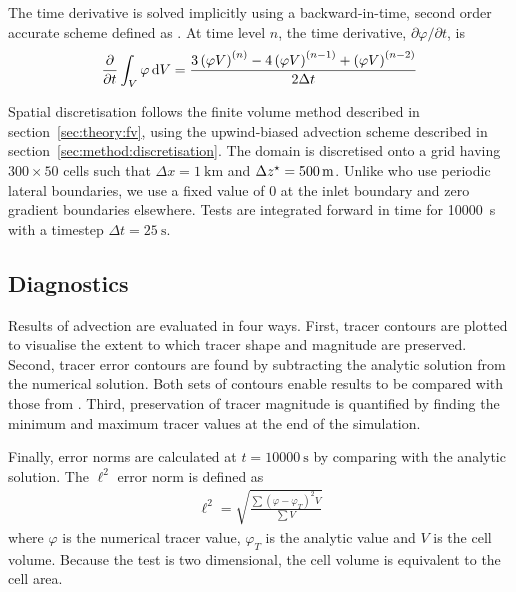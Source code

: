 The time derivative is solved implicitly using a backward-in-time, second order accurate scheme defined as \autocite{openfoam-progguide}.  At time level $n$, the time derivative, $\partial \varphi / \partial t$, is
\begin{align}
	\frac{\partial}{\partial t} \int_V \varphi \mathop{}\!\mathrm{d} V = \frac{
		3 \left( \varphi V \right)^{(n)} - 
		4 \left( \varphi V \right)^{(n-1)} + 
		\left( \varphi V \right)^{(n-2)}
	}{2 \Delta t}
\end{align}

Spatial discretisation follows the finite volume method described in section~\ref{sec:theory:fv}, using the upwind-biased advection scheme described in section~\ref{sec:method:discretisation}.
The domain is discretised onto a grid having $300 \times 50$ cells such that $\Delta x = \SI{1}{\kilo\meter}$ and $\Delta {z^\star} = \SI{500}{\meter}$.  Unlike \textcite{schaer2002} who use periodic lateral boundaries, we use a fixed value of 0 at the inlet boundary and zero gradient boundaries elsewhere.
Tests are integrated forward in time for \SI{10000}{\second} with a timestep $\Delta t = \SI{25}{\second}$.

\subsection{Diagnostics}
Results of advection are evaluated in four ways.  First, tracer contours are plotted to visualise the extent to which tracer shape and magnitude are preserved.  Second, tracer error contours are found by subtracting the analytic solution from the numerical solution.  Both sets of contours enable results to be compared with those from \textcite{schaer2002}.  Third, preservation of tracer magnitude is quantified by finding the minimum and maximum tracer values at the end of the simulation.

Finally, error norms are calculated at $t = \SI{10000}{\second}$ by comparing with the analytic solution.  The $\ell^2$ error norm is defined as
\begin{align}
\ell^2 = \sqrt{\frac{\sum \left( \varphi - \varphi_T \right)^2 V}{\sum V}}
\end{align}
where $\varphi$ is the numerical tracer value, $\varphi_T$ is the analytic value and $V$ is the cell volume.  Because the test is two dimensional, the cell volume is equivalent to the cell area.  

